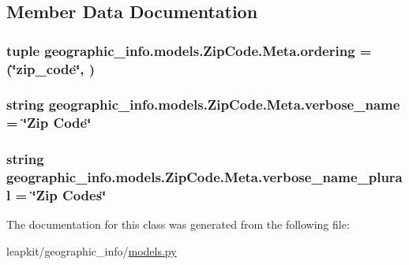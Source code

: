 \subsection{Member Data Documentation}
\hypertarget{classgeographic__info_1_1models_1_1_zip_code_1_1_meta_a7d25c0c820e382a4cc8e4692b5ef2421}{
\subsubsection[{ordering}]{\setlength{\rightskip}{0pt plus 5cm}tuple geographic\-\_\-info.\-models.\-Zip\-Code.\-Meta.\-ordering = (\char`\"{}zip\-\_\-code\char`\"{}, )\hspace{0.3cm}{\ttfamily [static]}}}\label{classgeographic__info_1_1models_1_1_zip_code_1_1_meta_a7d25c0c820e382a4cc8e4692b5ef2421}
\hypertarget{classgeographic__info_1_1models_1_1_zip_code_1_1_meta_a675a980f939680d8b9f0587d3e533c62}{
\subsubsection[{verbose\-\_\-name}]{\setlength{\rightskip}{0pt plus 5cm}string geographic\-\_\-info.\-models.\-Zip\-Code.\-Meta.\-verbose\-\_\-name = \char`\"{}Zip Code\char`\"{}\hspace{0.3cm}{\ttfamily [static]}}}\label{classgeographic__info_1_1models_1_1_zip_code_1_1_meta_a675a980f939680d8b9f0587d3e533c62}
\hypertarget{classgeographic__info_1_1models_1_1_zip_code_1_1_meta_a0c399ce4ccb77690767e8f4386f91580}{
\subsubsection[{verbose\-\_\-name\-\_\-plural}]{\setlength{\rightskip}{0pt plus 5cm}string geographic\-\_\-info.\-models.\-Zip\-Code.\-Meta.\-verbose\-\_\-name\-\_\-plural = \char`\"{}Zip Codes\char`\"{}\hspace{0.3cm}{\ttfamily [static]}}}\label{classgeographic__info_1_1models_1_1_zip_code_1_1_meta_a0c399ce4ccb77690767e8f4386f91580}


The documentation for this class was generated from the following file\-:\begin{DoxyCompactItemize}
\item 
leapkit/geographic\-\_\-info/\hyperlink{geographic__info_2models_8py}{models.\-py}\end{DoxyCompactItemize}
